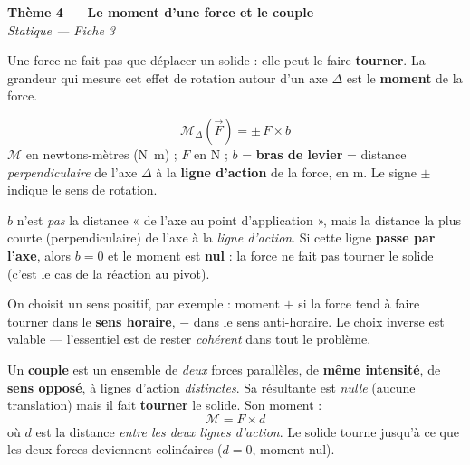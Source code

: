 \documentclass[11pt,a4paper]{article}
\newcommand{\vv}[1]{\vec{#1}}\newcommand{\ds}{\displaystyle}
\begin{document}
\begin{center}
{\LARGE\bfseries\color{primarydark}Thème 4 — Le moment d'une force et le couple}\\[2pt]
{\color{primary}\itshape Statique — Fiche 3}
\end{center}
\vspace{1mm}

Une force ne fait pas que déplacer un solide : elle peut le faire \textbf{tourner}. La grandeur qui
mesure cet effet de rotation autour d'un axe $\Delta$ est le \textbf{moment} de la force.

\begin{cle}
\[
\boxed{\;\mathcal{M}_\Delta(\vv F) = \pm\, F\times b\;}
\]
$\mathcal{M}$ en newtons-mètres (\si{\newton\metre}) ; $F$ en \si{\newton} ; $b$ = \textbf{bras de
levier} = distance \emph{perpendiculaire} de l'axe $\Delta$ à la \textbf{ligne d'action} de la force,
en \si{\metre}. Le signe $\pm$ indique le sens de rotation.
\end{cle}

\begin{piege}
$b$ n'est \emph{pas} la distance « de l'axe au point d'application », mais la distance la plus courte
(perpendiculaire) de l'axe à la \emph{ligne d'action}. Si cette ligne \textbf{passe par l'axe}, alors
$b=0$ et le moment est \textbf{nul} : la force ne fait pas tourner le solide (c'est le cas de la
réaction au pivot).
\end{piege}

\begin{remarque}
On choisit un sens positif, par exemple : moment $+$ si la force tend à faire tourner dans le
\textbf{sens horaire}, $-$ dans le sens anti-horaire. Le choix inverse est valable — l'essentiel est de
rester \emph{cohérent} dans tout le problème.
\end{remarque}

\begin{cle}
Un \textbf{couple} est un ensemble de \emph{deux} forces parallèles, de \textbf{même intensité}, de
\textbf{sens opposé}, à lignes d'action \emph{distinctes}. Sa résultante est \emph{nulle} (aucune
translation) mais il fait \textbf{tourner} le solide. Son moment :
\[
\boxed{\;\mathcal{M} = F\times d\;}
\]
où $d$ est la distance \emph{entre les deux lignes d'action}. Le solide tourne jusqu'à ce que les deux
forces deviennent colinéaires ($d=0$, moment nul).
\end{cle}
\end{document}
